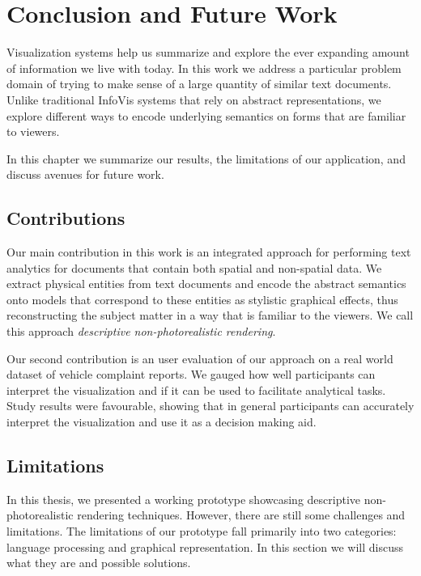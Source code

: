 \chapter{Conclusion and Future Work}
Visualization systems help us summarize and explore the ever expanding amount of
information we live with today. In this work we address a particular problem
domain of trying to make sense of a large quantity of similar text documents. Unlike
traditional InfoVis systems that rely on abstract representations, we explore different ways
to encode underlying semantics on \threed forms that are familiar to viewers. 

In this chapter we summarize our results, the limitations of our
application, and discuss avenues for future work.


\section{Contributions}
Our main contribution in this work is an integrated approach for performing text
analytics for documents that contain both spatial and non-spatial data. We extract
physical entities from text documents and encode the abstract semantics onto 
\threed models that correspond to these entities as stylistic graphical effects, thus 
reconstructing the subject matter in a way that is familiar to the viewers. We call
this approach \emph{descriptive non-photorealistic rendering}.

Our second contribution is an user evaluation of our approach on a real world dataset 
of vehicle complaint reports. We gauged how well participants can interpret the \threed 
visualization and if it can be used to facilitate analytical tasks. Study results were favourable, 
showing that in general participants can accurately interpret the visualization and use it as a
decision making aid. 




\section{Limitations}
In this thesis, we presented a working prototype showcasing descriptive
non-photorealistic rendering techniques. However, there are still some
challenges and limitations. The limitations of our prototype fall primarily into two
categories: language processing and graphical representation. In this section we
will discuss what they are and possible solutions.

